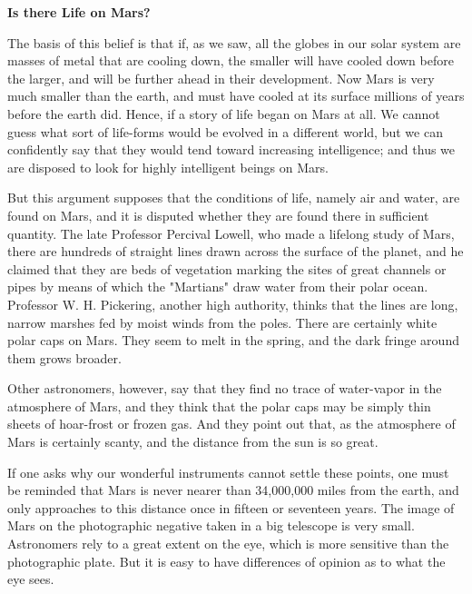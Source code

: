 \documentclass[12pt]{book}
\renewcommand{\indent}{\hspace{1cm}}
\begin{document}
\bigskip
\begin{center}
\textbf{Is there Life on Mars?}
\end{center}

\begin{spacing}{2}
\begin{linenumbers*}
\modulolinenumbers[5]
\indent The basis of this belief is that if, as we saw, all the globes in our solar system are masses of metal that are cooling down, the smaller will have cooled down before the larger, and will be further ahead in their development. Now Mars is very much smaller than the earth, and must have cooled at its surface millions of years before the earth did. Hence, if a story of life began on Mars at all. We cannot guess what sort of life-forms would be evolved in a different world, but we can confidently say that they would tend toward increasing intelligence; and thus we are disposed to look for highly intelligent beings on Mars.

\indent But this argument supposes that the conditions of life, namely air and water, are found on Mars, and it is disputed whether they are found there in sufficient quantity. The late Professor Percival Lowell, who made a lifelong study of Mars, there are hundreds of straight lines drawn across the surface of the planet, and he claimed that they are beds of vegetation marking the sites of great channels or pipes by means of which the "Martians" draw water from their polar ocean. Professor W. H. Pickering, another high authority, thinks that the lines are long, narrow marshes fed by moist winds from the poles. There are certainly white polar caps on Mars. They seem to melt in the spring, and the dark fringe around them grows broader.

\indent Other astronomers, however, say that they find no trace of water-vapor in the atmosphere of Mars, and they think that the polar caps may be simply thin sheets of hoar-frost or frozen gas. And they point out that, as the atmosphere of Mars is certainly scanty, and the distance from the sun is so great.

\indent If one asks why our wonderful instruments cannot settle these points, one must be reminded that Mars is never nearer than 34,000,000 miles from the earth, and only approaches to this distance once in fifteen or seventeen years. The image of Mars on the photographic negative taken in a big telescope is very small. Astronomers rely to a great extent on the eye, which is more sensitive than the photographic plate. But it is easy to have differences of opinion as to what the eye sees.


\end{linenumbers*}
\end{spacing}
\end{document}
